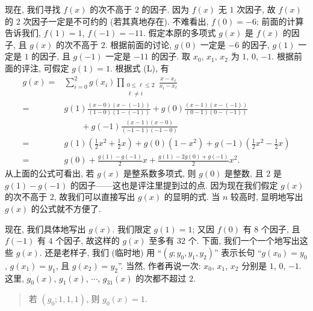 \begin{example}
    现在, 我们寻找 $f(x)$ 的次不高于 $2$ 的因子. 因为 $f(x)$ 无 $1$ 次因子, 故 $f(x)$ 的 $2$ 次因子一定是不可约的 (若其真地存在). 不难看出, $f(0) = -6$; 前面的计算告诉我们, $f(1) = 1$, $f(-1) = -11$. 假定本原的多项式 $g(x)$ 是 $f(x)$ 的因子, 且 $g(x)$ 的次不高于 $2$. 根据前面的讨论, $g(0)$ 一定是 $-6$ 的因子, $g(1)$ 一定是 $1$ 的因子, 且 $g(-1)$ 一定是 $-11$ 的因子. 取 $x_0$, $x_1$, $x_2$ 为 $1$, $0$, $-1$. 根据前面的评注, 可假定 $g(1) = 1$. 根据式 (L), 有
    \begin{align*}
        g(x)
        = {} & \sum_{i = 0}^{2} g(x_i) \prod_{\begin{smallmatrix}0 \leq \ell \leq 2 \\\ell \neq i\end{smallmatrix}} \frac{x - x_\ell}{x_i - x_\ell}                            \\
        = {} & g(1) \frac{(x-0)(x-(-1))}{(1-0)(1-(-1))} + g(0) \frac{(x-1)(x-(-1))}{(0-1)(0-(-1))}                                   \\
             & \qquad + g(-1) \frac{(x-1)(x-0)}{(-1-1)(-1-0)}                                                                        \\
        = {} & g(1) \left( \frac{1}{2}x^2 + \frac{1}{2}x \right) + g(0) (1-x^2) + g(-1) \left( \frac{1}{2}x^2 - \frac{1}{2}x \right) \\
        = {} & g(0) + \frac{g(1) - g(-1)}{2} x + \frac{g(1) - 2g(0) + g(-1)}{2} x^2.
    \end{align*}
    从上面的公式可看出, 若 $g(x)$ 是整系数多项式, 则 $g(0)$ 是整数, 且 $2$ 是 $g(1) - g(-1)$ 的因子——这也是评注里提到过的点. 因为现在我们假定 $g(x)$ 的次不高于 $2$, 故我们可以直接写出 $g(x)$ 的显明的式. 当 $n$ 较高时, 显明地写出 $g(x)$ 的公式就不方便了.

    现在, 我们具体地写出 $g(x)$. 我们限定 $g(1) = 1$; 又因 $f(0)$ 有 $8$ 个因子, 且 $f(-1)$ 有 $4$ 个因子, 故这样的 $g(x)$ 至多有 $32$ 个. 下面, 我们一个一个地写出这些 $g(x)$. 还是老样子, 我们 (临时地) 用 ``$(g; y_0, y_1, y_2)$'' 表示长句 ``$g(x_0) = y_0$, $g(x_1) = y_1$, 且 $g(x_2) = y_2$''. 当然, 作者再说一次: $x_0$, $x_1$, $x_2$ 分别是 $1$, $0$, $-1$. 这里, $g_0 (x)$, $g_1 (x)$, $\cdots$, $g_{31} (x)$ 的次都不超过 $2$.

    \begin{quotation}
        若 $(g_0; 1, 1, 1)$, 则 $g_0 (x) = 1$.


\end{quotation}
\end{example}
